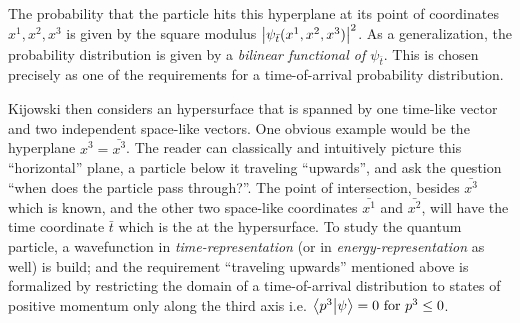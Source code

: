 The probability that the particle hits this hyperplane at its point of coordinates $x^1, x^2, x^3$
is given by the square modulus $\abs{\psi_{\bar{t}}(x^1, x^2, x^3)}^2$. As a generalization,
the probability distribution is given by a \emph{bilinear functional of $\psi_{\bar{t}}$}.
This is chosen precisely as one of the requirements for a time-of-arrival probability distribution.

Kijowski then considers an hypersurface that is spanned by one time-like vector and two independent
space-like vectors. One obvious example would be the hyperplane $x^3 = \bar{x^3}$.
The reader can classically and intuitively picture this ``horizontal'' plane,
a particle below it traveling ``upwards'', and ask the question
``when does the particle pass through?''. The point of intersection,
besides $\bar{x^3}$ which is known, and the other two space-like coordinates $\bar{x^1}$ and $\bar{x^2}$,
will have the time coordinate $\bar{t}$ which is the  at the hypersurface.
To study the quantum particle, a wavefunction in \emph{time-representation}
(or in \emph{energy-representation} as well) is build; and the requirement ``traveling upwards''
mentioned above is formalized by restricting the domain of a time-of-arrival
distribution to states of positive momentum only along the third axis i.e.
$\braket{p^3}{\psi} = 0 \text{ for } p^3 \leq 0$.


